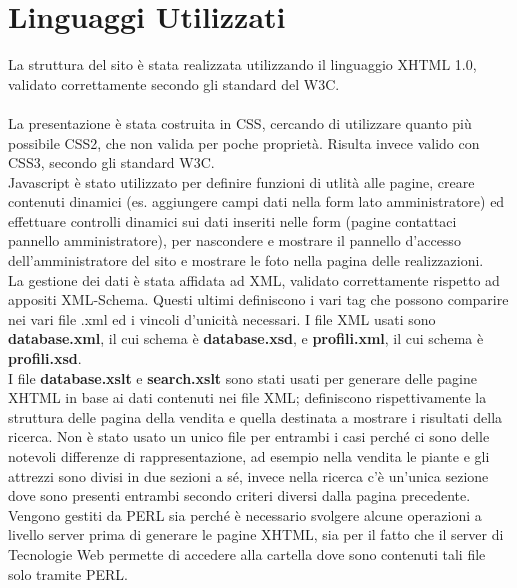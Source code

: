 \section{Linguaggi Utilizzati}{
	La struttura del sito è stata realizzata utilizzando il linguaggio XHTML 1.0, validato correttamente secondo gli standard del W3C. \\
	\\
	La presentazione è stata costruita in CSS, cercando di utilizzare quanto più possibile CSS2, che non valida per poche proprietà. Risulta invece valido con CSS3, secondo gli standard W3C.
	\\
	Javascript è stato utilizzato per definire funzioni di utlità alle pagine, creare contenuti dinamici (es. aggiungere campi dati nella form lato amministratore) ed effettuare controlli dinamici sui dati inseriti nelle form (pagine contattaci pannello amministratore), per nascondere e mostrare il pannello d'accesso dell'amministratore del sito e mostrare le foto nella pagina delle realizzazioni.
	\\
	La gestione dei dati è stata affidata ad XML, validato correttamente rispetto ad appositi XML-Schema. Questi ultimi definiscono i vari tag che possono comparire nei vari file .xml ed i vincoli d'unicità necessari. I file XML usati sono \textbf{database.xml}, il cui schema è \textbf{database.xsd}, e \textbf{profili.xml}, il cui schema è \textbf{profili.xsd}.\\
	I file \textbf{database.xslt} e \textbf{search.xslt} sono stati usati per generare delle pagine XHTML in base ai dati contenuti nei file XML; definiscono rispettivamente la struttura delle pagina della vendita e quella destinata a mostrare i risultati della ricerca. Non è stato usato un unico file per entrambi i casi perché ci sono delle notevoli differenze di rappresentazione, ad esempio nella vendita le piante e gli attrezzi sono divisi in due sezioni a sé, invece nella ricerca c'è un'unica sezione dove sono presenti entrambi secondo criteri diversi dalla pagina precedente.
	Vengono gestiti da PERL sia perché è necessario svolgere alcune operazioni a livello server prima di generare le pagine XHTML, sia per il fatto che il server di Tecnologie Web permette di accedere alla cartella dove sono contenuti tali file solo tramite PERL.
	\\
}

